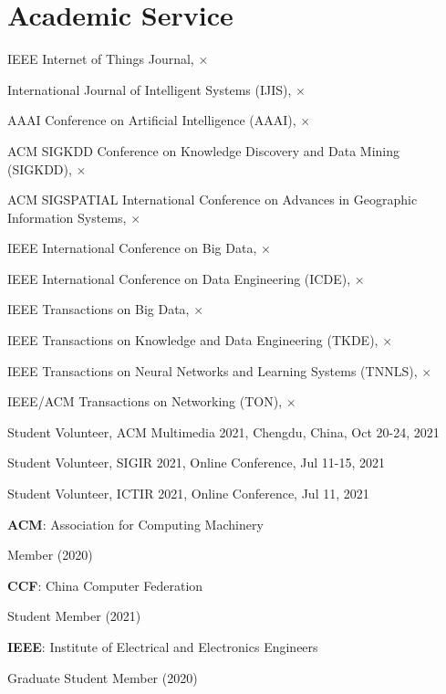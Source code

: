 \section*{Academic Service}


\indent

IEEE Internet of Things Journal, $\times$

International Journal of Intelligent Systems (IJIS), $\times$

AAAI Conference on Artificial Intelligence (AAAI), $\times$

ACM SIGKDD Conference on Knowledge Discovery and Data Mining (SIGKDD), $\times$

ACM SIGSPATIAL International Conference on Advances in Geographic Information Systems, $\times$

IEEE International Conference on Big Data, $\times$

IEEE International Conference on Data Engineering (ICDE), $\times$

IEEE Transactions on Big Data, $\times$

IEEE Transactions on Knowledge and Data Engineering (TKDE), $\times$

IEEE Transactions on Neural Networks and Learning Systems (TNNLS), $\times$

IEEE/ACM Transactions on Networking (TON), $\times$

\indent 

Student Volunteer, ACM Multimedia 2021, Chengdu, China, Oct 20-24, 2021

Student Volunteer, SIGIR 2021, Online Conference, Jul 11-15, 2021

Student Volunteer, ICTIR 2021, Online Conference, Jul 11, 2021

\indent 

\textbf{ACM}: Association for Computing Machinery 

\hspace{2em}Member (2020)

\textbf{CCF}: China Computer Federation

\hspace{2em}Student Member (2021)

\textbf{IEEE}: Institute of Electrical and Electronics Engineers

\hspace{2em}Graduate Student Member (2020)